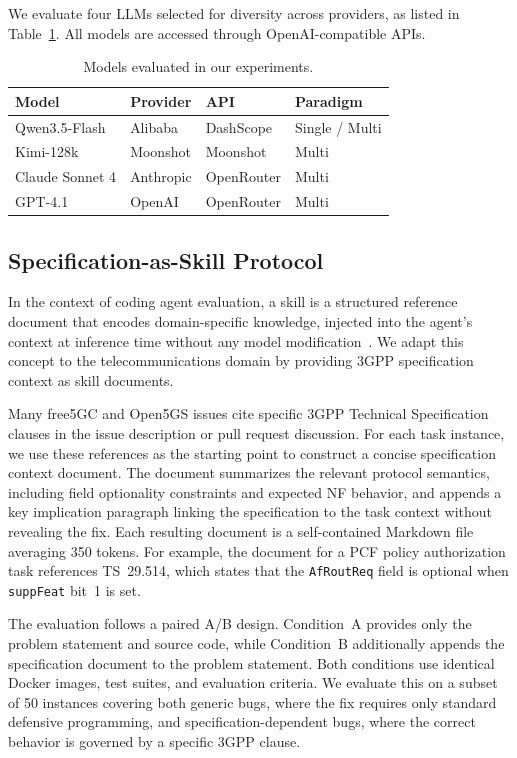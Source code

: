 \documentclass[10pt,conference]{IEEEtran}
\begin{document}
We evaluate four LLMs selected for diversity across providers, as listed in Table~\ref{tab:models}. All models are accessed through OpenAI-compatible APIs.

\begin{table}[t]
\centering
\caption{Models evaluated in our experiments.}
\label{tab:models}
\begin{tabular}{@{}llll@{}}
\toprule
Model & Provider & API & Paradigm \\
\midrule
Qwen3.5-Flash~\cite{qwen2025}   & Alibaba   & DashScope  & Single / Multi \\
Kimi-128k        & Moonshot  & Moonshot   & Multi \\
Claude Sonnet 4  & Anthropic & OpenRouter & Multi \\
GPT-4.1          & OpenAI    & OpenRouter & Multi \\
\bottomrule
\end{tabular}
\end{table}

\subsection{Specification-as-Skill Protocol}

In the context of coding agent evaluation, a skill is a structured reference document that encodes domain-specific knowledge, injected into the agent's context at inference time without any model modification~\cite{han2025sweskills}. We adapt this concept to the telecommunications domain by providing 3GPP specification context as skill documents.

Many free5GC and Open5GS issues cite specific 3GPP Technical Specification clauses in the issue description or pull request discussion. For each task instance, we use these references as the starting point to construct a concise specification context document. The document summarizes the relevant protocol semantics, including field optionality constraints and expected NF behavior, and appends a key implication paragraph linking the specification to the task context without revealing the fix. Each resulting document is a self-contained Markdown file averaging 350 tokens. For example, the document for a PCF policy authorization task references TS~29.514, which states that the \texttt{AfRoutReq} field is optional when \texttt{suppFeat} bit~1 is set.

The evaluation follows a paired A/B design. Condition~A provides only the problem statement and source code, while Condition~B additionally appends the specification document to the problem statement. Both conditions use identical Docker images, test suites, and evaluation criteria. We evaluate this on a subset of 50 instances covering both generic bugs, where the fix requires only standard defensive programming, and specification-dependent bugs, where the correct behavior is governed by a specific 3GPP clause.
\end{document}
